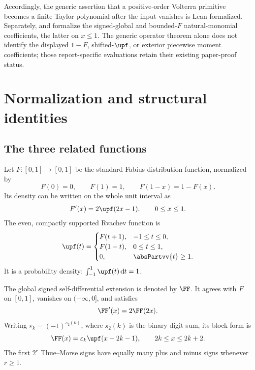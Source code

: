 \documentclass[11pt,oneside]{article}
\theoremstyle{definition}
\theoremstyle{remark}
\newcommand{\dd}{\,\mathrm d}
\newcommand{\eps}{\varepsilon}
\newcommand{\1}{\mathbf 1}
\begin{document}
Accordingly, the generic assertion that a positive-order Volterra primitive becomes a finite
Taylor polynomial after the input vanishes is Lean formalized.  Separately,
 and
 formalize the signed-global and
bounded-\(F\) natural-monomial coefficients, the latter on \(x\le1\).  The generic operator
theorem alone does not identify the displayed \(1-F\), shifted-\(\upf\), or exterior
piecewise moment coefficients; those report-specific evaluations retain their existing
paper-proof status.

\section{Normalization and structural identities}

\subsection{The three related functions}

Let \(F:[0,1]\to[0,1]\) be the standard Fabius distribution function, normalized by
\[
 F(0)=0,\qquad F(1)=1,\qquad F(1-x)=1-F(x).
\]
Its density can be written on the whole unit interval as
\begin{equation}
 F'(x)=2\upf(2x-1),\qquad 0\le x\le1.                 \label{p6:eq:Fprime-up}
\end{equation}
The even, compactly supported Rvachev function is
\begin{equation}
 \upf(t)=
 \begin{cases}
   F(t+1),&-1\le t\le0,\\
   F(1-t),&0\le t\le1,\\
   0,&\absPartvv{t}\ge1.
 \end{cases}                                             \label{p6:eq:up-F}
\end{equation}
It is a probability density: \(\int_{-1}^1\upf(t)\dd t=1\).

The global signed self-differential extension is denoted by \(\FF\).  It agrees with
\(F\) on \([0,1]\), vanishes on \(( -\infty,0]\), and satisfies
\begin{equation}
 \FF'(x)=2\FF(2x).                                      \label{p6:eq:global-selfdiff}
\end{equation}
Writing \(\eps_k=(-1)^{s_2(k)}\), where \(s_2(k)\) is the binary digit sum, its block
form is
\begin{equation}
 \FF(x)=\eps_k\upf(x-2k-1),\qquad 2k\le x\le2k+2.       \label{p6:eq:block}
\end{equation}
The first \(2^r\) Thue--Morse signs have equally many plus and minus signs whenever
\(r\ge1\).
\end{document}
